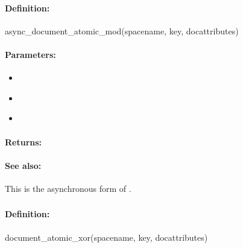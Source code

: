 \paragraph{Definition:}
\begin{rubycode}
async_document_atomic_mod(spacename, key, docattributes)
\end{rubycode}

\paragraph{Parameters:}
\begin{itemize}[noitemsep]
\item {}\\

\item {}\\

\item {}\\

\end{itemize}

\paragraph{Returns:}


\paragraph{See also:}  This is the asynchronous form of .

\pagebreak
\subsubsection{}
\label{api:ruby:document_atomic_xor}


\paragraph{Definition:}
\begin{rubycode}
document_atomic_xor(spacename, key, docattributes)
\end{rubycode}

